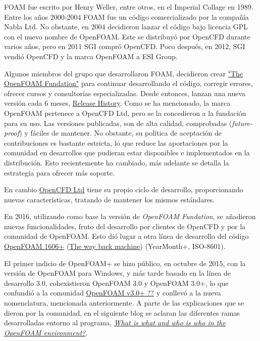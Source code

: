FOAM fue escrito por Henry Weller, entre otros, en el Imperial Collage
en 1989. Entre los años 2000-2004 FOAM fue un código comercializado por
la compañía Nabla Ltd. No obstante, en 2004 decidieron lanzar el código
bajo licencia GPL con el nuevo nombre de OpenFOAM. Este se distribuyó
por OpenCFD durante varios años, pero en 2011 SGI compró OpenCFD. Poco
después, en 2012, SGI vendió OpenCFD y la marca OpenFOAM a ESI Group.

Algunos miembros del grupo que desarrollaron FOAM, decidieron crear
\href{http://www.openfoam.org/contrib/}{"The OpenFOAM Fundation"} para
continuar desarrollando el código, corregir errores, ofrecer cursos y
consultorías especializadas. Desde entonces, lanzan una nueva versión
cada 6 meses, \href{https://openfoam.org/download/history/}{Release
History}. Como se ha mencionado, la marca OpenFOAM pertenece a OpenCFD
Ltd, pero se la concedieron a la fundación para su uso. Las versiones
publicadas, son de alta calidad, comprobadas (\emph{future-proof}) y
fáciles de mantener. No obstante, su política de aceptación de
contribuciones es bastante estricta, lo que reduce las aportaciones por
la comunidad en desarrollos que pudieran estar disponibles e
implementados en la distribución. Esto recientemente ha cambiado, más
adelante se detalla la estrategia para ofrecer más soporte.

En cambio
\href{https://www.cfd-online.com/Forums/openfoam-news-announcements-opencfd/165324-opencfd-pleased-announce-release-openfoam-v3-0-a.html}{OpenCFD
Ltd} tiene su propio ciclo de desarrollo, proporcionando nuevas
características, tratando de mantener los mismos estándares.

En 2016, utilizando como base la versión de \emph{OpenFOAM Fundation},
se añadieron nuevas funcionalidades, fruto del desarrollo por clientes
de OpenCFD y por la comunidad de OpenFOAM. Esto dió lugar a otra línea
de desarrollo del código
\href{http://www.openfoam.com:80/version-v1606+/}{OpenFOAM 1606+}
(\href{https://web.archive.org/web/20170622010404/http://www.openfoam.com:80/version-v1606+/}{The
way back machine}) (YearMonth+, ISO-8601).

El primer indicio de OpenFOAM+ se hizo público, en octubre de 2015, con
la versión de OpenFOAM para Windows, y más tarde basado en la línea de
desarrollo 3.0, cohexistieron OpenFOAM 3.0 y OpenFOAM 3.0+, lo que
confundió a la comunidad
\href{https://www.cfd-online.com/Forums/openfoam/165322-openfoam-v3-0-a.html}{OpenFOAM
v3.0+ ??} y conllevó a la nueva nomenclatura, mencionada anteriormente.
A parte de las explicaciones que se dieron por la comunidad, en el
siguiente blog se aclaran las diferentes ramas desarrolladas entorno al
programa,
\href{https://sites.google.com/view/olaflowcfd/blog/old-blog-entries/what-is-what-and-who-is-who-in-the-openfoam-environment}{\emph{What
is what and who is who in the OpenFOAM environment?}}.

